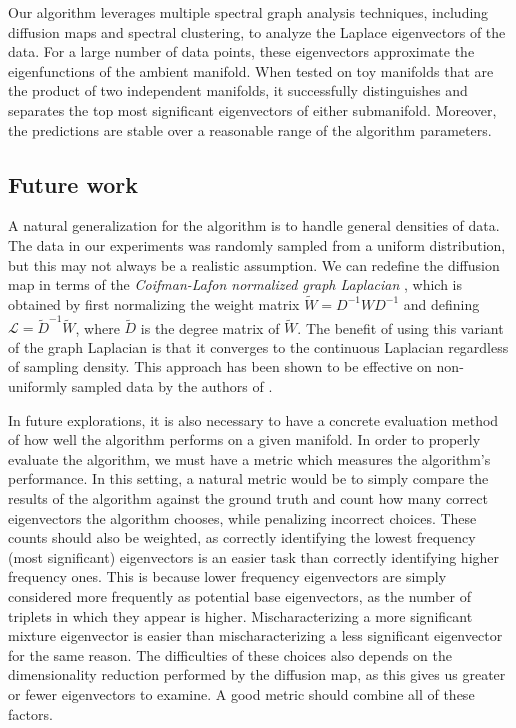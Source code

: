 \documentclass{article}
\numberwithin{equation}{section}
\theoremstyle{definition}
\begin{document}
Our algorithm leverages multiple spectral graph analysis techniques, including diffusion maps and spectral clustering, to analyze the Laplace eigenvectors of the data. For a large number of data points, these eigenvectors approximate the eigenfunctions of the ambient manifold. When tested on toy manifolds that are the product of two independent manifolds, it successfully distinguishes and separates the top most significant eigenvectors of either submanifold. Moreover, the predictions are stable over a reasonable range of the algorithm parameters.

\subsection{Future work}
A natural generalization for the algorithm is to handle general densities of data. The data in our experiments was randomly sampled from a uniform distribution, but this may not always be a realistic assumption. We can redefine the diffusion map in terms of the \textit{Coifman-Lafon normalized graph Laplacian} \cite{coifman2006diffusion}, which is obtained by first normalizing the weight matrix $\widetilde{W} = D^{-1}WD^{-1}$ and defining $\mathcal{L} = \widetilde{D}^{-1}\widetilde{W}$, where $\widetilde{D}$ is the degree matrix of $\widetilde{W}$. The benefit of using this variant of the graph Laplacian is that it converges to the continuous Laplacian regardless of sampling density. This approach has been shown to be effective on non-uniformly sampled data by the authors of \cite{zelesko2019earthmover}.

In future explorations, it is also necessary to have a concrete evaluation method of how well the algorithm performs on a given manifold. In order to properly evaluate the algorithm, we must have a metric which measures the algorithm's performance. In this setting, a natural metric would be to simply compare the results of the algorithm against the ground truth and count how many correct eigenvectors the algorithm chooses, while penalizing incorrect choices. These counts should also be weighted, as correctly identifying the lowest frequency (most significant) eigenvectors is an easier task than correctly identifying higher frequency ones. This is because lower frequency eigenvectors are simply considered more frequently as potential base eigenvectors, as the number of triplets in which they appear is higher. Mischaracterizing a more significant mixture eigenvector is easier than mischaracterizing a less significant eigenvector for the same reason. The difficulties of these choices also depends on the dimensionality reduction performed by the diffusion map, as this gives us greater or fewer eigenvectors to examine. A good metric should combine all of these factors.
\end{document}
